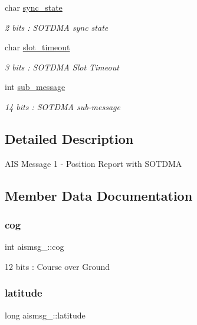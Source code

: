 \begin{DoxyCompactItemize}
char \mbox{\hyperlink{structaismsg__1_a3124bb3fe2b89616922d84e0d0172c2c}{sync\+\_\+state}}
\begin{DoxyCompactList}\small\item\em 2 bits \+: S\+O\+T\+D\+MA sync state \end{DoxyCompactList}\item 
char \mbox{\hyperlink{structaismsg__1_a01116b72acb9d90e5cdb0480f31f1466}{slot\+\_\+timeout}}
\begin{DoxyCompactList}\small\item\em 3 bits \+: S\+O\+T\+D\+MA Slot Timeout \end{DoxyCompactList}\item 
int \mbox{\hyperlink{structaismsg__1_ad1571b3f751a8277ec252b26580db719}{sub\+\_\+message}}
\begin{DoxyCompactList}\small\item\em 14 bits \+: S\+O\+T\+D\+MA sub-\/message \end{DoxyCompactList}\end{DoxyCompactItemize}


\subsection{Detailed Description}
A\+IS Message 1 -\/ Position Report with S\+O\+T\+D\+MA 

\subsection{Member Data Documentation}
\mbox{\label{structaismsg__1_a5d51c80074e1ed65fc01ee0b728e6b0b}} 
\subsubsection{\texorpdfstring{cog}{cog}}
{\footnotesize\ttfamily int aismsg\+\_\+::cog}



12 bits \+: Course over Ground 

\mbox{\label{structaismsg__1_ac084e306c9aca5fce13c4881fa299453}} 
\subsubsection{\texorpdfstring{latitude}{latitude}}
{\footnotesize\ttfamily long aismsg\+\_\+::latitude}



